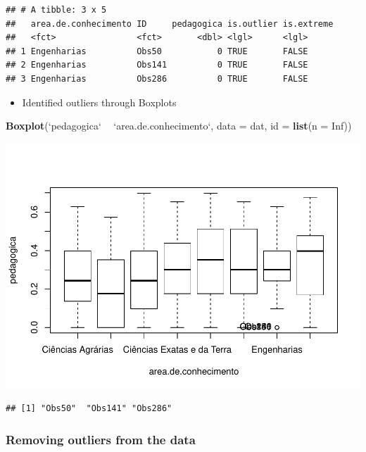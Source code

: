 \documentclass[]{article}
\newenvironment{Shaded}{\begin{snugshade}}{\end{snugshade}}
\newcommand{\DataTypeTok}[1]{\textcolor[rgb]{0.13,0.29,0.53}{#1}}
\newcommand{\KeywordTok}[1]{\textcolor[rgb]{0.13,0.29,0.53}{\textbf{#1}}}
\newcommand{\NormalTok}[1]{#1}
\newcommand{\OperatorTok}[1]{\textcolor[rgb]{0.81,0.36,0.00}{\textbf{#1}}}
\newcommand{\OtherTok}[1]{\textcolor[rgb]{0.56,0.35,0.01}{#1}}
\newcommand{\StringTok}[1]{\textcolor[rgb]{0.31,0.60,0.02}{#1}}
\providecommand{\tightlist}{%
  \setlength{\itemsep}{0pt}\setlength{\parskip}{0pt}}
\begin{document}
\begin{verbatim}
## # A tibble: 3 x 5
##   area.de.conhecimento ID     pedagogica is.outlier is.extreme
##   <fct>                <fct>       <dbl> <lgl>      <lgl>     
## 1 Engenharias          Obs50           0 TRUE       FALSE     
## 2 Engenharias          Obs141          0 TRUE       FALSE     
## 3 Engenharias          Obs286          0 TRUE       FALSE
\end{verbatim}

\begin{itemize}
\tightlist
\item
  Identified outliers through Boxplots
\end{itemize}

\begin{Shaded}
\begin{Highlighting}[]
\KeywordTok{Boxplot}\NormalTok{(}\StringTok{`}\DataTypeTok{pedagogica}\StringTok{`} \OperatorTok{~}\StringTok{ `}\DataTypeTok{area.de.conhecimento}\StringTok{`}\NormalTok{, }\DataTypeTok{data =}\NormalTok{ dat, }\DataTypeTok{id =} \KeywordTok{list}\NormalTok{(}\DataTypeTok{n =} \OtherTok{Inf}\NormalTok{))}
\end{Highlighting}
\end{Shaded}

\includegraphics{factorialAnova_files/figure-latex/unnamed-chunk-6-1.pdf}

\begin{verbatim}
## [1] "Obs50"  "Obs141" "Obs286"
\end{verbatim}

\hypertarget{removing-outliers-from-the-data}{%
\subsubsection{Removing outliers from the
data}\label{removing-outliers-from-the-data}}
\end{document}
